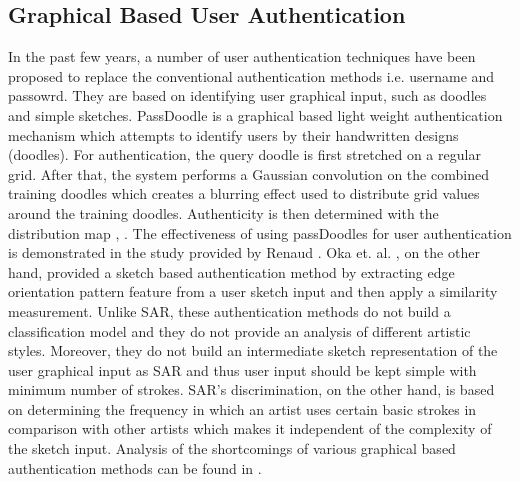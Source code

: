 \subsection{Graphical Based User Authentication }
\vspace{-2mm}
In the past few years, a number of user authentication techniques have been proposed to replace the conventional authentication methods i.e. username and passowrd. They are based on identifying user graphical input, such as doodles and simple sketches. 
PassDoodle is a graphical based light weight authentication mechanism which attempts to identify users by their handwritten designs (doodles). For authentication, the query doodle is first stretched on a regular grid. After that, the system performs a Gaussian convolution on the combined training doodles which creates a blurring effect used to distribute grid values around the training doodles. Authenticity is then determined with the distribution map \cite{varenhorst2004passdoodle}, \cite{Govindarajulu:2007:PMU:1322192.1322233}. The effectiveness of using passDoodles for user authentication is demonstrated in the study provided by Renaud . Oka et. al. , on the other hand, provided a sketch based authentication method by extracting edge orientation pattern feature from a user sketch input and then apply a similarity measurement. Unlike SAR, these authentication methods do not build a classification model and they do not provide an analysis of different artistic styles. Moreover, they do not build an intermediate sketch representation of the user graphical input as SAR and thus user input should be kept simple with minimum number of strokes. SAR's discrimination, on the other hand, is based on determining the frequency in which an artist uses certain basic strokes in comparison with other artists which makes it independent of the complexity of the sketch input. Analysis of the shortcomings of various graphical based authentication methods can be found in \cite{gani2010new}.






